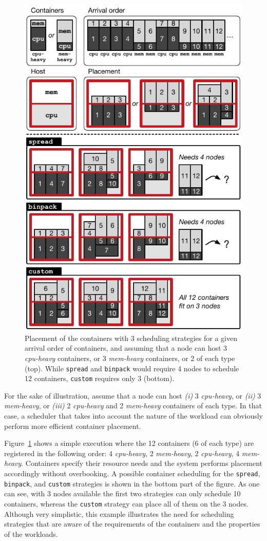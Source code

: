 \begin{figure}[t]
  \centering
  \includegraphics[width=.7\linewidth]{figures/scenario}
  \caption{Placement of the containers with 3 scheduling strategies for a given arrival order of containers, and assuming that a node can host 3 \emph{cpu-heavy} containers, or 3 \emph{mem-heavy} containers, or 2 of each type (top). While \texttt{spread} and \texttt{binpack} would require 4 nodes to schedule 12 containers, \texttt{custom} requires only 3 (bottom).}
  \label{fig:motivating-placement}
\end{figure}

For the sake of illustration, assume that a node can host \emph{(i)} 3 \emph{cpu-heavy}, or \emph{(ii)} 3 \emph{mem-heavy}, or \emph{(iii)} 2 \emph{cpu-heavy} and 2 \emph{mem-heavy} containers of each type.
In that case, a scheduler that takes into account the nature of the workload can obviously perform more efficient container placement.

Figure~\ref{fig:motivating-placement} shows a simple execution where the 12 containers (6 of each type) are registered in the following order: 4 \emph{cpu-heavy}, 2 \emph{mem-heavy}, 2 \emph{cpu-heavy}, 4 \emph{mem-heavy}.
Containers specify their resource needs and the system performs placement accordingly without overbooking.
A possible container scheduling for the \texttt{spread}, \texttt{binpack}, and \texttt{custom} strategies is shown in the bottom part of the figure.
As one can see, with 3 nodes available the first two strategies can only schedule 10 containers, whereas the \texttt{custom} strategy can place all of them on the 3 nodes.
Although very simplistic, this example illustrates the need for scheduling strategies that are aware of the requirements of the containers and the properties of the workloads.

